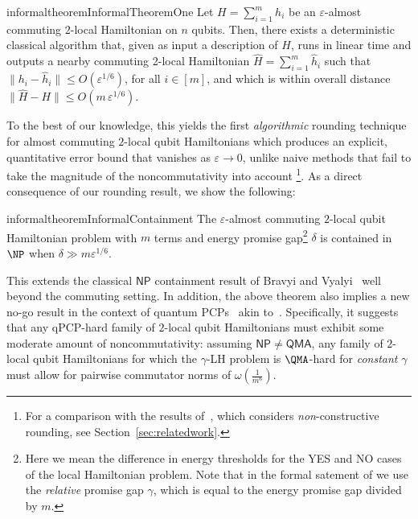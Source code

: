 \documentclass[11pt]{article}
\theoremstyle{plain}
\newcommand{\eps}{\varepsilon}
\begin{document}
\begin{restatable}{informaltheorem}{InformalTheoremOne}
Let $H=\sum_{i=1}^m h_i$ be an $\eps$-almost commuting $2$-local 
Hamiltonian on $n$ qubits. Then, there exists a deterministic classical algorithm that, given as input a description of $H$, runs 
in linear time and outputs a nearby commuting 2-local Hamiltonian $\hat{H}=\sum_{i=1}^m 
\hat{h}_i$ such that $\|h_i - \hat{h}_i\| \leq O(\eps^{1/6})$, for all 
$i \in [m]$, and which is within overall distance 
$\|\hat{H} - H\| \leq O(m \,\eps^{1/6})$.
\end{restatable}
To the best of our knowledge, this yields the first \emph{algorithmic} rounding technique for almost commuting $2$-local qubit Hamiltonians which produces an explicit, quantitative error bound that vanishes as $\varepsilon \rightarrow 0$, unlike naive methods that fail to take the magnitude of the noncommutativity into account
\footnote{For a comparison with the results of~\cite{arad2011notepartialnogotheorem}, which considers \emph{non}-constructive rounding, see Section~\ref{sec:relatedwork}.}.
As a direct consequence of our rounding result, we show the following:



\begin{restatable}{informaltheorem}{InformalContainment}
    The $\eps$-almost commuting $2$-local qubit Hamiltonian problem with $m$ terms and energy promise gap\footnote{Here we mean the difference in energy thresholds for the YES and NO cases of the local Hamiltonian problem. Note that in the formal satement of  we use the \emph{relative} promise gap $\gamma$, which is equal to the energy promise gap divided by $m$.} $\delta$ is contained in $\NP$ when $\delta \gg m \eps^{1/6}$.
\end{restatable}
This extends the classical $\mathsf{NP}$ containment result of Bravyi and Vyalyi~\cite{bravyi2004commutativeversionklocalhamiltonian} well
beyond the commuting setting.
In addition, the above theorem also implies a new no-go result in the context of quantum PCPs~\cite{aharonov2011complexity,Hastings2012} akin to~\cite{arad2011notepartialnogotheorem}. Specifically, it suggests that any qPCP-hard family of $2$-local qubit Hamiltonians must exhibit some moderate amount of noncommutativity: assuming $\mathsf{NP} \neq \mathsf{QMA}$, any
family of $2$-local qubit Hamiltonians for which the $\gamma$-LH problem is $\QMA$-hard for \emph{constant} $\gamma$ must allow for pairwise commutator norms of $\omega(\frac{1}{m^6})$.
\end{document}
